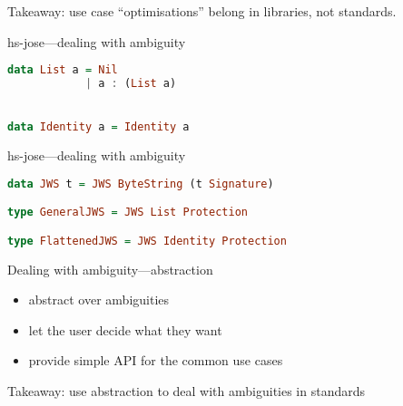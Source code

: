 \documentclass[ignorenonframetext,aspectratio=43]{beamer}
\providecommand{\tightlist}{%
  \setlength{\itemsep}{0pt}\setlength{\parskip}{0pt}}
\begin{document}




\begin{frame}[plain]
\huge
Takeaway: use case ``optimisations'' belong in libraries, not standards.
\end{frame}


\begin{frame}[fragile]{hs-jose---dealing with ambiguity}
\begin{lstlisting}[language=Haskell]
data List a = Nil
            | a : (List a)


data Identity a = Identity a
\end{lstlisting}
\end{frame}

\begin{frame}[fragile]{hs-jose---dealing with ambiguity}
\begin{lstlisting}[language=Haskell]
data JWS t = JWS ByteString (t Signature)

type GeneralJWS = JWS List Protection

type FlattenedJWS = JWS Identity Protection
\end{lstlisting}
\end{frame}

\begin{frame}{Dealing with ambiguity---abstraction}
\begin{itemize}
\tightlist
\item abstract over ambiguities
\item let the user decide what they want
\item provide simple API for the common use cases
\end{itemize}
\end{frame}

\begin{frame}[plain]
\huge
Takeaway: use abstraction to deal with ambiguities in standards
\end{frame}
\end{document}
